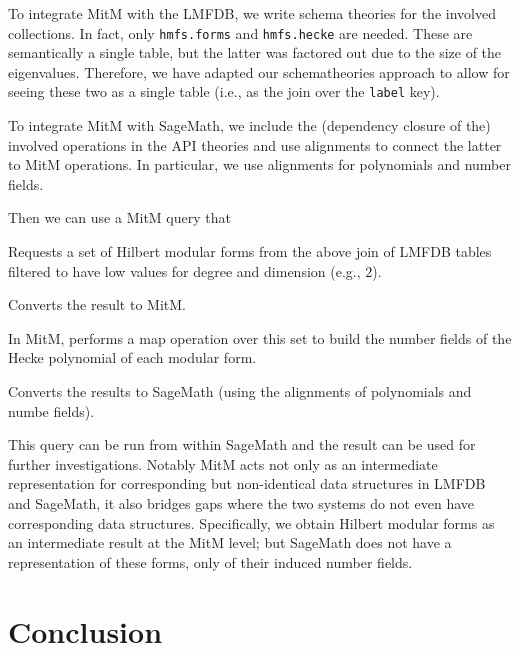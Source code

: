 \documentclass{llncs}
\begin{document}
To integrate MitM with the LMFDB, we write schema theories for the involved collections.
In fact, only \texttt{hmfs.forms} and \texttt{hmfs.hecke} are needed.
These are semantically a single table, but the latter was factored out due to the size of the eigenvalues.
Therefore, we have adapted our schematheories approach to allow for seeing these two as a single table (i.e., as the join over the \texttt{label} key).

To integrate MitM with SageMath, we include the (dependency closure of the) involved operations in the API theories and use alignments to connect the latter to MitM operations.
In particular, we use alignments for polynomials and number fields.

Then we can use a MitM query that
\begin{compactenum}
 \item Requests a set of Hilbert modular forms from the above join of LMFDB tables filtered to have low values for degree and dimension (e.g., $2$).
 \item Converts the result to MitM.
 \item In MitM, performs a map operation over this set to build the number fields of the Hecke polynomial of each modular form.
 \item Converts the results to SageMath (using the alignments of polynomials and numbe fields).
\end{compactenum}

This query can be run from within SageMath and the result can be used for further investigations.
Notably MitM acts not only as an intermediate representation for corresponding but non-identical data structures in LMFDB and SageMath, it also bridges gaps where the two systems do not even have corresponding data structures.
Specifically, we obtain Hilbert modular forms as an intermediate result at the MitM level; but SageMath does not have a representation of these forms, only of their induced number fields.


\section{Conclusion}




\end{document}
